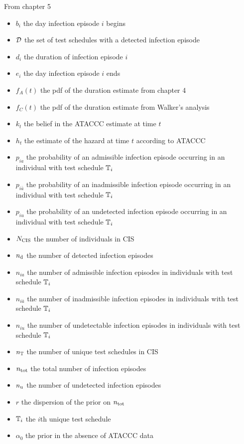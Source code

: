 \documentclass[thesis.tex]{subfiles}
\begin{document}
From chapter 5
\begin{itemize}
    \item $b_i$ the day infection episode $i$ begins
    \item $\mathcal{D}$ the set of test schedules with a detected infection episode
    \item $d_i$ the duration of infection episode $i$
    \item $e_i$ the day infection episode $i$ ends
    \item $f_A(t)$ the pdf of the duration estimate from chapter 4
    \item $f_C(t)$ the pdf of the duration estimate from Walker's analysis
    \item $k_t$ the belief in the ATACCC estimate at time $t$
    \item $h_t$ the estimate of the hazard at time $t$ according to ATACCC
    \item $p_{ia}$ the probability of an admissible infection episode occurring in an individual with test schedule $\mathbb{T}_i$
    \item $p_{i\bar{a}}$ the probability of an inadmissible infection episode occurring in an individual with test schedule $\mathbb{T}_i$
    \item $p_{iu}$ the probability of an undetected infection episode occurring in an individual with test schedule $\mathbb{T}_i$
    \item $N_\text{CIS}$ the number of individuals in CIS
    \item $n_\text{d}$ the number of detected infection episodes
    \item $n_{ia}$ the number of admissible infection episodes in individuals with test schedule $\mathbb{T}_i$
    \item $n_{i\bar{a}}$ the number of inadmissible infection episodes in individuals with test schedule $\mathbb{T}_i$
    \item $n_{iu}$ the number of undetectable infection episodes in individuals with test schedule $\mathbb{T}_i$
    \item $n_{\mathbb{T}}$ the number of unique test schedules in CIS
    \item $n_\text{tot}$ the total number of infection episodes
    \item $n_\text{u}$ the number of undetected infection episodes
    \item $r$ the dispersion of the prior on $n_\text{tot}$
    \item $\mathbb{T}_i$ the $i$th unique test schedule
    \item $\alpha_0$ the prior in the absence of ATACCC data

\end{itemize}
\end{document}
